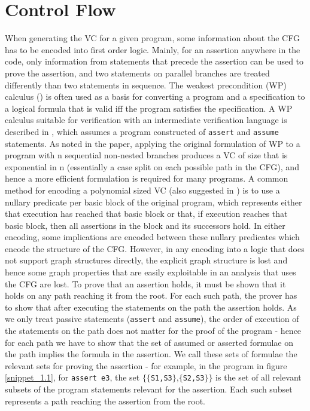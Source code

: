\section{Control Flow}
When generating the VC for a given program, some information about the CFG has to be encoded into first order logic.
Mainly, for an assertion anywhere in the code, only information from statements that precede the assertion can be used to prove the assertion, and two statements on parallel branches are treated differently than two statements in sequence.
The weakest precondition (WP) calculus (\cite{Dijkstra:1975:GCN:360933.360975}) is often used as a basis for converting a program and a specification to a logical formula that is valid iff the program satisfies the specification. 
A WP calculus suitable for verification with an intermediate verification language is described in \cite{Leino:2005:EWP:1066417.1710882}, which assumes a program constructed of \lstinline|assert| and \lstinline|assume| statements. As noted in the paper, applying the original formulation of WP to a program with n sequential non-nested branches produces a VC of size that is exponential in n (essentially a case split on each possible path in the CFG), and hence a more efficient formulation is required for many programs.
A common method for encoding a polynomial sized VC (also suggested in \cite{Leino:2005:EWP:1066417.1710882}) 
is to use a nullary predicate per basic block of the original program, which represents either that execution has reached that basic block or that, if execution reaches that basic block, then all assertions in the block and its successors hold. 
In either encoding, some implications are encoded between these nullary predicates which encode the structure of the CFG.
However, in any encoding into a logic that does not support graph structures directly, the explicit graph structure is lost and hence some graph properties that are easily exploitable in an analysis that uses the CFG are lost.
To prove that an assertion holds, it must be shown that it holds on any path reaching it from the root.
For each such path, the prover has to show that after executing the statements on the path the assertion holds.
As we only treat passive statements (\lstinline|assert| and \lstinline|assume|), the order of execution of the statements on the path does not matter for the proof of the program - hence for each path we have to show that the set of assumed or asserted formulae on the path implies the formula in the assertion. We call these sets of formulae the relevant sets for proving the assertion - for example,  in the program in figure \ref{snippet_1.1},
for \lstinline{assert e3}, the set $\{\{$\lstinline{S1,S3}$\}$,$\{$\lstinline{S2,S3}$\}\}$ is the set of all relevant subsets of the program statements relevant for the assertion. Each such subset represents a path reaching the assertion from the root. 


